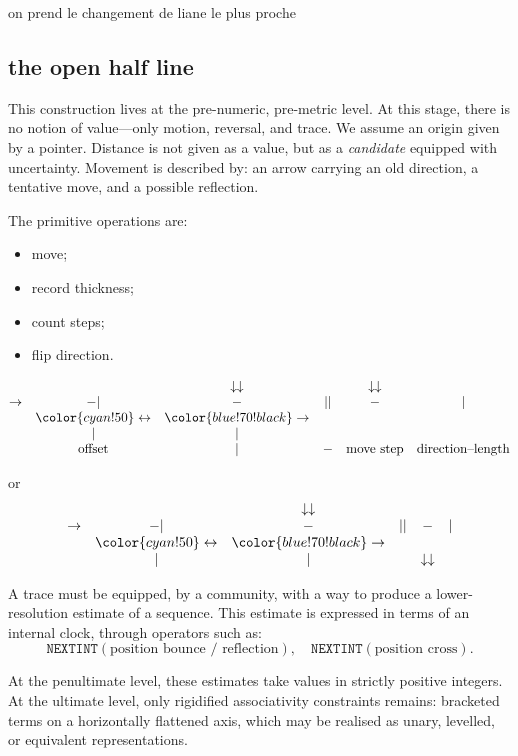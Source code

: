 \documentclass{article}
\newcommand{\lightblue}[1]{{\color{cyan!50} #1}}
\newcommand{\darkblue}[1]{{\color{blue!70!black} #1}}
\begin{document}
on prend le changement de liane le plus proche  
  
                                                                                         
\subsection{the open half line}
This construction lives at the pre-numeric, pre-metric level.
At this stage, there is no notion of value—only motion, reversal, and trace.
We assume an origin given by a pointer.
Distance is not given as a value, but as a \emph{candidate} equipped with uncertainty.
Movement is described by:
an arrow carrying an old direction,
a tentative move,
and a possible reflection.

The primitive operations are:
\begin{itemize}
\item move;
\item record thickness;
\item count steps;
\item flip direction.
\end{itemize}

$$
\begin{matrix}
&&\downarrow\downarrow&&\downarrow \downarrow&\\
\rightarrow&-|&-&||&-&|\\
&\lightblue{\leftrightarrow}&\darkblue{\rightarrow}&&&\\
&|&|&&&\\
&\text{offset}&|&-&\text{move step}&\text{direction--length}
\end{matrix}
$$

or 
$$
\begin{matrix}
&&\downarrow\downarrow&&&\\
\rightarrow&-|&-&||&-&|\\
&\lightblue{\leftrightarrow}&\darkblue{\rightarrow}&&&\\
&|&|&&\downarrow \downarrow&\\
\end{matrix}
$$

A trace must be equipped, by a community, with a way to produce
a lower-resolution estimate of a sequence.
This estimate is expressed in terms of an internal clock,
through operators such as:
\[
\texttt{NEXTINT}(\text{position bounce / reflection}),
\quad
\texttt{NEXTINT}(\text{position cross}).
\]

At the penultimate level, these estimates take values in strictly positive integers.
At the ultimate level, only  rigidified associativity constraints remains:
bracketed terms on a horizontally flattened axis,
which may be realised as unary, levelled, or equivalent representations.
\end{document}

